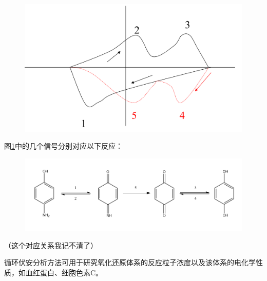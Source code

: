 \begin{example}
	\begin{figure}[!h]
		\centering
		\includegraphics[width=0.7\linewidth]{image/chp7_circular_VA_example}
		\caption{}
		\label{fig:chp7circularvaexample}
	\end{figure}
	图\ref{fig:chp7circularvaexample}中的几个信号分别对应以下反应：
	\begin{figure}[!h]
		\centering
		\includegraphics[width=\linewidth]{image/chp7_circular_VA_example_result}
		\label{fig:chp7circularvaexampleresult}
	\end{figure}

	（这个对应关系我记不清了）
\end{example}
循环伏安分析方法可用于研究氧化还原体系的反应粒子浓度以及该体系的电化学性质，如血红蛋白、细胞色素C。
